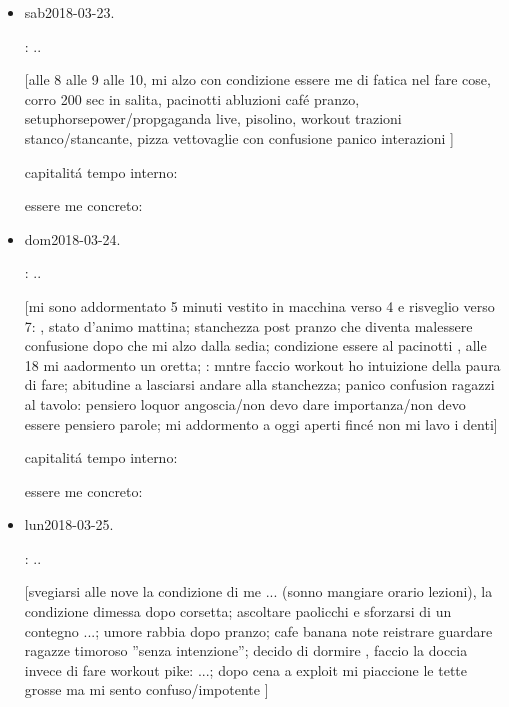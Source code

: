 \begin{itemize}
capitalit\'a tempo interno: 

essere me concreto: 

\item{sab}{2018-03-23}.

: ..

[alle 8 alle 9 alle 10, mi alzo con condizione essere me di fatica nel fare cose, corro 200 sec in salita, pacinotti abluzioni caf\'e pranzo, setuphorsepower/propgaganda live, pisolino, workout trazioni stanco/stancante, pizza vettovaglie con confusione panico interazioni ]

capitalit\'a tempo interno: 

essere me concreto: 

\item{dom}{2018-03-24}.

: ..

[mi sono addormentato 5 minuti vestito in macchina verso 4 e risveglio verso 7: , stato d'animo mattina; stanchezza post pranzo che diventa malessere confusione dopo che mi alzo dalla sedia; condizione essere al  pacinotti , alle 18 mi aadormento un oretta; : mntre faccio workout ho intuizione della paura di fare; abitudine a lasciarsi andare alla stanchezza; panico confusion ragazzi al tavolo: pensiero loquor angoscia/non devo dare importanza/non devo essere pensiero parole; mi addormento a oggi aperti finc\'e non mi lavo i denti]

capitalit\'a tempo interno: 

essere me concreto: 

\item{lun}{2018-03-25}.

: ..

[svegiarsi alle nove la condizione di me ... (sonno mangiare orario lezioni), la condizione dimessa dopo corsetta; ascoltare paolicchi e sforzarsi di un contegno ...; umore rabbia dopo pranzo; cafe banana note reistrare guardare ragazze timoroso ''senza intenzione''; decido di dormire , faccio la doccia invece di fare workout pike: ...; dopo cena a exploit mi piaccione le tette grosse ma mi sento confuso/impotente ]


\end{itemize}
